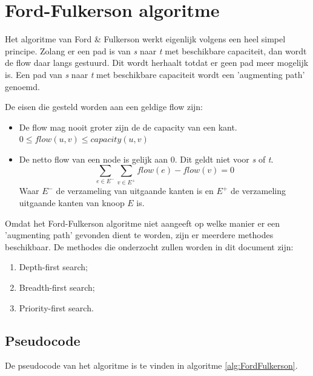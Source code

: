 \section{Ford-Fulkerson algoritme}
\label{sec:fordfulkerson}

Het algoritme van Ford \& Fulkerson werkt eigenlijk volgens een heel simpel principe. Zolang er een pad is van \textit{s} naar \textit{t} met beschikbare capaciteit, dan wordt de flow daar langs gestuurd. Dit wordt herhaalt totdat er geen pad meer mogelijk is. Een pad van \textit{s} naar \textit{t} met beschikbare capaciteit wordt een 'augmenting path' genoemd.

De eisen die gesteld worden aan een geldige flow zijn:

\begin{itemize}
	\item De flow mag nooit groter zijn de de capacity van een kant. $0 \leq flow(u,v) \leq capacity(u,v)$
	\item De netto flow van een node is gelijk aan 0. Dit geldt niet voor \textit{s} of \textit{t}.$$\sum_{e \in E^-}\sum_{v \in E^+}{flow(e)-flow(v)} = 0$$
Waar $E^-$ de verzameling van uitgaande kanten is en $E^+$ de verzameling uitgaande kanten van knoop $E$ is.
\end{itemize}

Omdat het Ford-Fulkerson algoritme niet aangeeft op welke manier er een 'augmenting path' gevonden dient te worden, zijn er meerdere methodes beschikbaar.
De methodes die onderzocht zullen worden in dit document zijn:

\begin{enumerate}
	\item Depth-first search;
	\item Breadth-first search;
	\item Priority-first search.
\end{enumerate}

\subsection{Pseudocode}

De pseudocode van het algoritme is te vinden in algoritme \ref{alg:FordFulkerson}.

